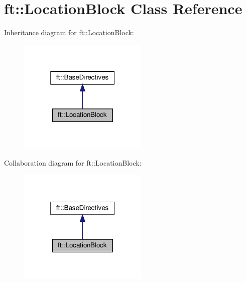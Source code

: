 \hypertarget{classft_1_1LocationBlock}{}\section{ft\+:\+:Location\+Block Class Reference}
\label{classft_1_1LocationBlock}


Inheritance diagram for ft\+:\+:Location\+Block\+:\nopagebreak
\begin{figure}[H]
\begin{center}
\leavevmode
\includegraphics[width=175pt]{classft_1_1LocationBlock__inherit__graph}
\end{center}
\end{figure}


Collaboration diagram for ft\+:\+:Location\+Block\+:\nopagebreak
\begin{figure}[H]
\begin{center}
\leavevmode
\includegraphics[width=175pt]{classft_1_1LocationBlock__coll__graph}
\end{center}
\end{figure}
